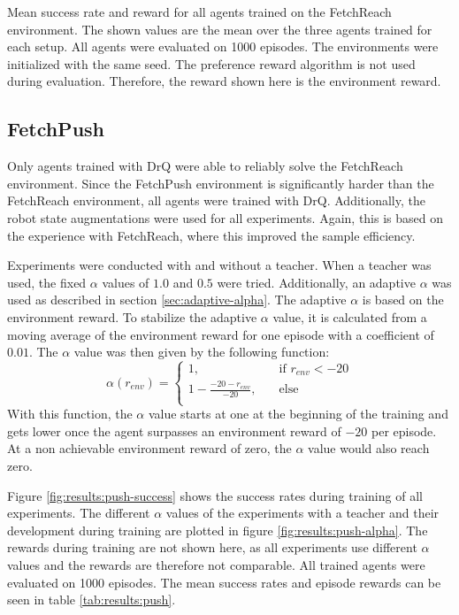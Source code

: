 \begin{table}[btp]
    \centering
    
    \caption[Mean success rate and reward for all agents trained on the FetchReach environment.]{Mean success rate and reward for all agents trained on the FetchReach environment. The shown values are the mean over the three agents trained for each setup. All agents were evaluated on 1000 episodes. The environments were initialized with the same seed. The preference reward algorithm is not used during evaluation. Therefore, the reward shown here is the environment reward.}
    \label{tab:results:reach}
\end{table}

\subsection{FetchPush}
\label{sec:results:fetch-push}

Only agents trained with DrQ were able to reliably solve the FetchReach environment. Since the FetchPush environment is significantly harder than the FetchReach environment, all agents were trained with DrQ. Additionally, the robot state augmentations were used for all experiments. Again, this is based on the experience with FetchReach, where this improved the sample efficiency.

Experiments were conducted with and without a teacher. When a teacher was used, the fixed $\alpha$ values of $1.0$ and $0.5$ were tried. Additionally, an adaptive $\alpha$ was used as described in section \ref{sec:adaptive-alpha}. The adaptive $\alpha$ is based on the environment reward. To stabilize the adaptive $\alpha$ value, it is calculated from a moving average of the environment reward for one episode with a coefficient of $0.01$. The $\alpha$ value was then given by the following function:
\[
\alpha(r_{env}) = \begin{cases}
        1, &\quad\text{if } r_{env} < -20\\
        1-\frac{-20-r_{env}}{-20}, &\quad\text{else}\\
    \end{cases}
\]
With this function, the $\alpha$ value starts at one at the beginning of the training and gets lower once the agent surpasses an environment reward of $-20$ per episode. At a non achievable environment reward of zero, the $\alpha$ value would also reach zero.

Figure \ref{fig:results:push-success} shows the success rates during training of all experiments. The different $\alpha$ values of the experiments with a teacher and their development during training are plotted in figure \ref{fig:results:push-alpha}. The rewards during training are not shown here, as all experiments use different $\alpha$ values and the rewards are therefore not comparable. All trained agents were evaluated on 1000 episodes. The mean success rates and episode rewards can be seen in table \ref{tab:results:push}.

